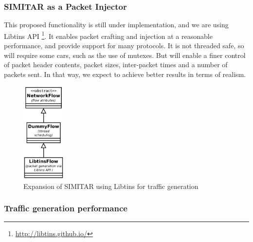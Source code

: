 
\subsubsection{SIMITAR as a Packet Injector}

This proposed functionality is still under implementation, and we are using Libtins API \footnote{\href{http://libtins.github.io/}{http://libtins.github.io/}}. It enables packet crafting and injection at a reasonable performance, and provide support for many protocols. It is not threaded safe, so will require some cars, such as the use of mutexes. But will enable a finer control of packet header contents, packet sizes, inter-packet times and a number of packets sent. In that way, we expect to achieve better results in terms of realism.



\begin{figure}[!ht]
	\centering
	\includegraphics[height=2.0in]{figures/ch6/libtins-flow}
	\caption{Expansion of SIMITAR using Libtins for traffic generation}
	\label{fig:libtins-flow}
\end{figure}

\subsubsection{Traffic generation performance}


